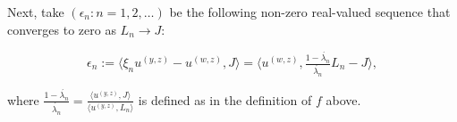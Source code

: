 \documentclass[ecta,nameyear,draft]{econsocart}
\makeatletter
\newcommand\mdoubleplus{\text{\srcsize$+\mkern-2mu+$}}
\newcommand{\mbbt}{{\mathds {T}}}
\newcommand{\yz}{{(y,z)}}
\newcommand{\zw}{(z,w)}
\newcommand{\wz}{(w,z)}
\newcommand{\srcsize}{\@setfontsize{\srcsize}{3pt}{3pt}}
\theoremstyle{plain}
\theoremstyle{remark}
\makeatother
\begin{document}
\begin{appendix}
  Next, take $(\epsilon_n : n = 1, 2, \dots)$ be the following non-zero
  real-valued sequence that converges to zero as $L_n \rightarrow J$:
  \begin{linenomath*}
    \begin{equation} \label{eq-epsilon}
      \epsilon_n := \langle \xi_n u^{\yz} - u^{\wz}, J\rangle = \langle u^{\wz},
      \tfrac{1 - \acute{\lambda_n}}{\acute{\lambda_n}} L_n - J \rangle,
    \end{equation}
  \end{linenomath*}
  where $\frac{1 - \acute{\lambda_n}}{\acute{\lambda_n}} = \frac{\langle
  u^{\yz}, J\rangle}{\langle u^{\yz}, L_n\rangle}$ is defined as in the
  definition of $f$ above.





\end{appendix}
\end{document}
